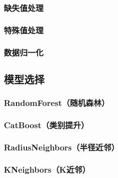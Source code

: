 \documentclass{ctexart}
\begin{document}
\subsubsection{缺失值处理}

\subsubsection{特殊值处理}

\subsubsection{数据归一化}

\subsection{模型选择}


\subsubsection{RandomForest（随机森林）}

\subsubsection{CatBoost（类别提升）}

\subsubsection{RadiusNeighbors（半径近邻）}

\subsubsection{KNeighbors（K近邻）}



\end{document}
